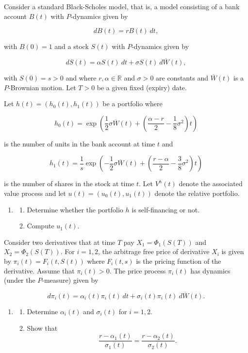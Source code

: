 \documentclass[
]{book}
\providecommand{\tightlist}{%
  \setlength{\itemsep}{0pt}\setlength{\parskip}{0pt}}
\begin{document}
Consider a standard Black-Scholes model, that is, a model consisting of a bank account \(B(t)\) with \(P\)-dynamics given by

\[
dB(t)=rB(t)\ dt,
\]

with \(B(0)=1\) and a stock \(S(t)\) with \(P\)-dynamics given by

\[
dS(t)=\alpha S(t)\ dt+\sigma S(t)\ d\overline{W}(t),
\]

with \(S(0)=s>0\) and where \(r,\alpha\in\mathbb{R}\) and \(\sigma >0\) are constants and \(\overline{W}(t)\) is a \(P\)-Brownian motion. Let \(T>0\) be a given fixed (expiry) date.

Let \(h(t)=\left(h_0(t),h_1(t)\right)\) be a portfolio where

\[
h_0(t)=\exp\left(\frac{1}{2}\sigma\overline{W}(t)+\left(\frac{\alpha - r}{2}-\frac{1}{8}\sigma^2\right)t\right)
\]

is the number of units in the bank account at time \(t\) and

\[
h_1(t)=\frac{1}{s}\exp\left(-\frac{1}{2}\sigma\overline{W}(t)+\left(\frac{r-\alpha}{2}-\frac{3}{8}\sigma^2\right)t\right)
\]

is the number of shares in the stock at time \(t\). Let \(V^h(t)\) denote the associated value process and let \(u(t)=\left(u_0(t),u_1(t)\right)\) denote the relative portfolio.

\begin{enumerate}
\def\labelenumi{\alph{enumi}.}
\item
  \begin{enumerate}
  \def\labelenumii{\roman{enumii}.}
  \tightlist
  \item
    Determine whether the portfolio \(h\) is self-financing or not.
  \item
    Compute \(u_1(t)\).
  \end{enumerate}
\end{enumerate}

Consider two derivatives that at time \(T\) pay \(X_1=\Phi_1(S(T))\) and \(X_2=\Phi_2(S(T))\). For \(i=1,2\), the arbitrage free price of derivative \(X_i\) is given by \(\pi_i(t)=F_i(t,S(t))\) where \(F_i(t,s)\) is the pricing function of the derivative. Assume that \(\pi_i(t)>0\). The price process \(\pi_i(t)\) has dynamics (under the \(P\)-measure) given by

\[
d\pi_i(t)=\alpha_i(t)\pi_i(t)\ dt+\sigma_i(t)\pi_i(t)\ d\overline{W}(t).
\]

\begin{enumerate}
\def\labelenumi{\alph{enumi}.}
\setcounter{enumi}{1}
\item
  \begin{enumerate}
  \def\labelenumii{\roman{enumii}.}
  \tightlist
  \item
    Determine \(\alpha_i(t)\) and \(\sigma_i(t)\) for \(i=1,2\).
  \item
    Show that
    \[
    \frac{r-\alpha_1(t)}{\sigma_1(t)}=\frac{r-\alpha_2(t)}{\sigma_2(t)}.
    \]
  \end{enumerate}
\end{enumerate}
\end{document}
